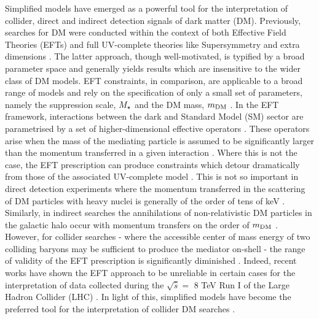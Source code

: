 
Simplified models have emerged as a powerful tool for the interpretation of collider, direct and indirect detection signals of dark matter (DM). Previously,  searches for DM were conducted within the context of both Effective Field Theories (EFTs) \cite{Aad:1363019, ATLAS-CONF-2012-147, CMS-PAS-EXO-12-048, Buckley:2013jwa, Abdallah:1472683, MonoZ, MonoX} and full UV-complete theories like Supersymmetry \cite{ComppMSSM, Aad:2012ms, Aad:2012fqa, Aad:2014wea, SUSY_official_paper} and extra dimensions \cite{}. The latter approach, though well-motivated, is typified by a broad parameter space and generally yields results which are insensitive to the wider class of DM models. EFT constraints, in comparison, are applicable to a broad range of models and rely on the specification of only a small set of parameters, namely the suppression scale, $M_{\star}$ and the DM mass, $m_{\mathrm{DM}}$ \cite{}.
In the EFT framework, interactions between the dark and Standard Model (SM) sector are parametrised by a set of higher-dimensional effective operators \cite{}. These operators arise when the mass of the mediating particle is assumed to be significantly larger than the momentum transferred in a given interaction \cite{}. Where this is not the case, the EFT prescription can produce constraints which detour dramatically from those of the associated UV-complete model \cite{Bai:2010hh, DMCons2, Fox:2011fx, Graesser:2011vj, An:2011ck}. This is not so important in direct detection experiments where the momentum transferred in the scattering of DM particles with heavy nuclei is generally of the order of tens of keV \cite{EFTDM, DMCons3}. Similarly, in indirect searches the annihilations of non-relativistic DM particles in the galactic halo occur with momentum transfers on the order of $m_{\mathrm{DM}}$ \cite{}. However, for collider searches - where the accessible center of mass energy of two colliding baryons may be sufficient to produce the mediator on-shell - the range of validity of the EFT prescription is significantly diminished \cite{}. Indeed, recent works have shown the EFT approach to be unreliable in certain cases for the interpretation of data collected during the $\sqrt{\hat{s}} =$ 8 TeV Run I of the Large Hadron Collider (LHC) \cite{}. In light of this, simplified models have become the preferred tool for the interpretation of collider DM searches \cite{Harris:2014hga, Buchmueller:2014yoa}.

